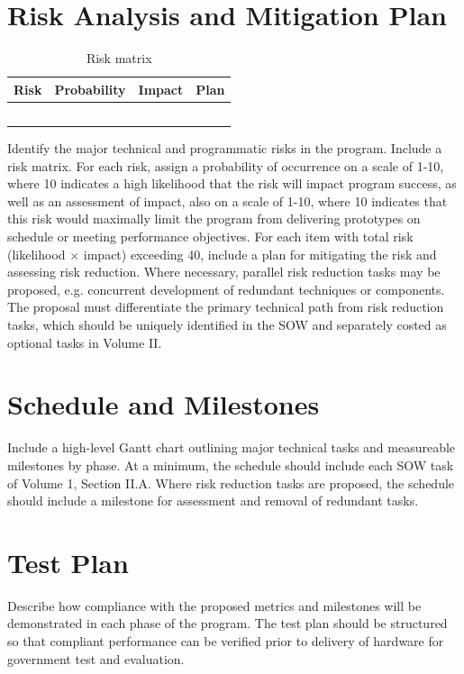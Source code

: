 \section{Risk Analysis and Mitigation Plan}

\begin{table}[h!]
\centering
\begin{tabular}{|c||c|c|c|}
    \hline
    Risk & Probability & Impact & Plan\\
    \hline
    \hline
    & & & \\
    \hline
    & & & \\
    \hline
    & & & \\
    \hline
    & & & \\
    \hline
    & & & \\
    \hline
\end{tabular}
\caption{Risk matrix}
\label{table:risk}
\end{table}

Identify the major technical and programmatic risks in the program. Include a risk matrix.
For each risk, assign a probability of occurrence on a scale of 1-10, where 10 indicates a high
likelihood that the risk will impact program success, as well as an assessment of impact, also
on a scale of 1-10, where 10 indicates that this risk would maximally limit the program from
delivering prototypes on schedule or meeting performance objectives. For each item with
total risk (likelihood × impact) exceeding 40, include a plan for mitigating the risk and
assessing risk reduction.
Where necessary, parallel risk reduction tasks may be proposed, e.g. concurrent development
of redundant techniques or components. The proposal must differentiate the primary
technical path from risk reduction tasks, which should be uniquely identified in the SOW and
separately costed as optional tasks in Volume II.
\section{Schedule and Milestones}
Include a high-level Gantt chart outlining major technical tasks and measureable milestones
by phase. At a minimum, the schedule should include each SOW task of Volume 1, Section
II.A. Where risk reduction tasks are proposed, the schedule should include a milestone for
assessment and removal of redundant tasks.

\section{Test Plan}
Describe how compliance with the proposed metrics and milestones will be demonstrated in
each phase of the program. The test plan should be structured so that compliant performance
can be verified prior to delivery of hardware for government test and evaluation.
